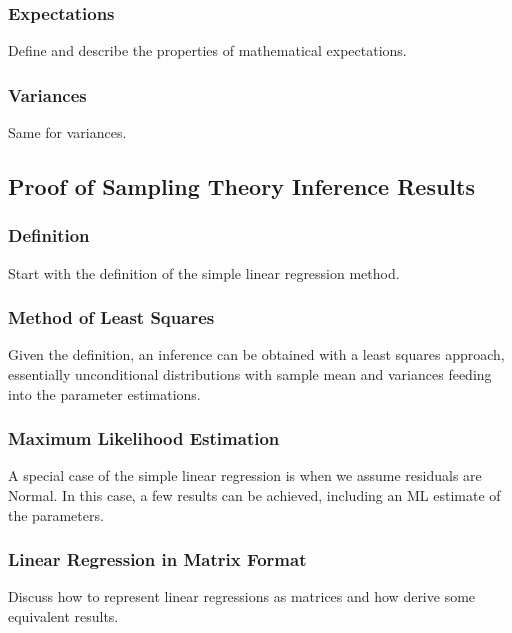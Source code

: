 \subsubsection{Expectations}

Define and describe the properties of mathematical expectations.

\subsubsection{Variances}

Same for variances.

\subsection{Proof of Sampling Theory Inference Results}

\subsubsection{Definition}

Start with the definition of the simple linear regression method.

\subsubsection{Method of Least Squares}

Given the definition, 
an inference can be obtained with a least squares approach, 
essentially unconditional distributions with sample mean and
variances feeding into the parameter estimations.

\subsubsection{Maximum Likelihood Estimation}

A special case of the simple linear regression is when we assume
residuals are Normal. 
In this case, a few results can be achieved,
including an ML estimate of the parameters.

\subsubsection{Linear Regression in Matrix Format}

Discuss how to represent linear regressions as matrices and how derive some equivalent results.



